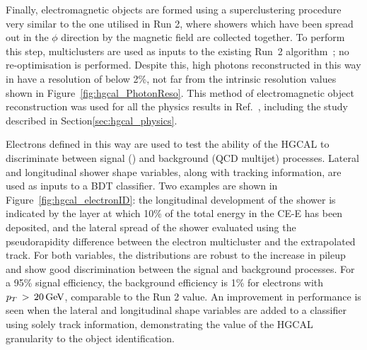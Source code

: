 Finally, electromagnetic objects are formed using a superclustering procedure very similar to the one utilised in Run 2, 
where showers which have been spread out in the $\phi$ direction by the magnetic field are collected together.
To perform this step, multiclusters are used as inputs to the existing Run~2 algorithm~\cite{PhotonReco}; no re-optimisation is performed.
Despite this, high \pt photons reconstructed in this way in have a resolution of below 2\%, 
not far from the intrinsic resolution values shown in Figure~\ref{fig:hgcal_PhotonReso}.
This method of electromagnetic object reconstruction was used for all the physics results in Ref.~\cite{HGCAL}, 
including the study described in Section\ref{sec:hgcal_physics}.

Electrons defined in this way are used to test the ability of the HGCAL 
to discriminate between signal (\Zee) and background (QCD multijet) processes. 
Lateral and longitudinal shower shape variables, 
along with tracking information, are used as inputs to a BDT classifier. 
Two examples are shown in Figure~\ref{fig:hgcal_electronID}: 
the longitudinal development of the shower is indicated by the layer 
at which 10\% of the total energy in the CE-E has been deposited, 
and the lateral spread of the shower evaluated using the pseudorapidity difference 
between the electron multicluster and the extrapolated track.
For both variables, the distributions are robust to the increase in pileup 
and show good discrimination between the signal and background processes.
For a 95\% signal efficiency, the background efficiency is 1\% 
for electrons with $p_T\,>\,\SI{20}{GeV}$, comparable to the Run 2 value. %
An improvement in performance is seen when the lateral and longitudinal shape variables 
are added to a classifier using solely track information, 
demonstrating the value of the HGCAL granularity to the object identification.

